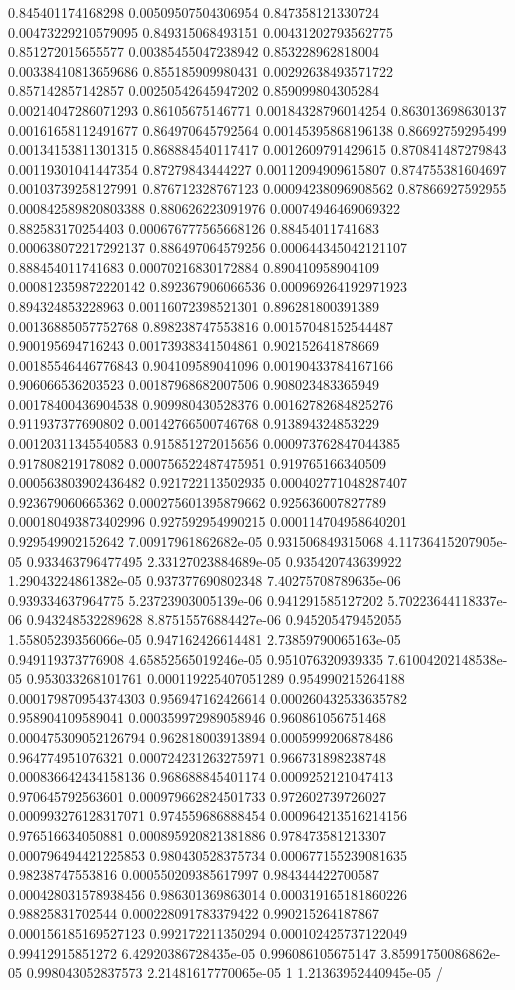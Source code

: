 \begin{table}
\begin{tabu}
\begin{sparkline}{10}
0.845401174168298 0.00509507504306954 0.847358121330724 0.00473229210579095 0.849315068493151 0.00431202793562775 0.851272015655577 0.00385455047238942 0.853228962818004 0.00338410813659686 0.855185909980431 0.00292638493571722 0.857142857142857 0.00250542645947202 0.859099804305284 0.00214047286071293 0.86105675146771 0.00184328796014254 0.863013698630137 0.00161658112491677 0.864970645792564 0.00145395868196138 0.86692759295499 0.00134153811301315 0.868884540117417 0.0012609791429615 0.870841487279843 0.00119301041447354 0.87279843444227 0.00112094909615807 0.874755381604697 0.00103739258127991 0.876712328767123 0.00094238096908562 0.87866927592955 0.000842589820803388 0.880626223091976 0.00074946469069322 0.882583170254403 0.000676777565668126 0.88454011741683 0.000638072217292137 0.886497064579256 0.000644345042121107 0.888454011741683 0.00070216830172884 0.890410958904109 0.000812359872220142 0.892367906066536 0.000969264192971923 0.894324853228963 0.00116072398521301 0.896281800391389 0.00136885057752768 0.898238747553816 0.00157048152544487 0.900195694716243 0.00173938341504861 0.902152641878669 0.00185546446776843 0.904109589041096 0.00190433784167166 0.906066536203523 0.00187968682007506 0.908023483365949 0.00178400436904538 0.909980430528376 0.00162782684825276 0.911937377690802 0.00142766500746768 0.913894324853229 0.00120311345540583 0.915851272015656 0.000973762847044385 0.917808219178082 0.000756522487475951 0.919765166340509 0.000563803902436482 0.921722113502935 0.000402771048287407 0.923679060665362 0.000275601395879662 0.925636007827789 0.000180493873402996 0.927592954990215 0.000114704958640201 0.929549902152642 7.00917961862682e-05 0.931506849315068 4.11736415207905e-05 0.933463796477495 2.33127023884689e-05 0.935420743639922 1.29043224861382e-05 0.937377690802348 7.40275708789635e-06 0.939334637964775 5.23723903005139e-06 0.941291585127202 5.70223644118337e-06 0.943248532289628 8.87515576884427e-06 0.945205479452055 1.55805239356066e-05 0.947162426614481 2.73859790065163e-05 0.949119373776908 4.65852565019246e-05 0.951076320939335 7.61004202148538e-05 0.953033268101761 0.000119225407051289 0.954990215264188 0.000179870954374303 0.956947162426614 0.000260432533635782 0.958904109589041 0.000359972989058946 0.960861056751468 0.000475309052126794 0.962818003913894 0.0005999206878486 0.964774951076321 0.000724231263275971 0.966731898238748 0.000836642434158136 0.968688845401174 0.0009252121047413 0.970645792563601 0.000979662824501733 0.972602739726027 0.000993276128317071 0.974559686888454 0.000964213516214156 0.976516634050881 0.000895920821381886 0.978473581213307 0.000796494421225853 0.980430528375734 0.000677155239081635 0.98238747553816 0.000550209385617997 0.984344422700587 0.000428031578938456 0.986301369863014 0.000319165181860226 0.98825831702544 0.000228091783379422 0.990215264187867 0.000156185169527123 0.992172211350294 0.000102425737122049 0.99412915851272 6.42920386728435e-05 0.996086105675147 3.85991750086862e-05 0.998043052837573 2.21481617770065e-05 1 1.21363952440945e-05 /

\end{sparkline}
\end{tabu}
\end{table}
